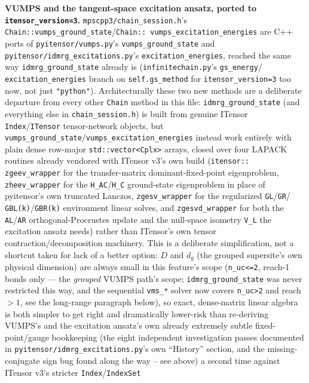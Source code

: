 \documentclass[11pt]{article}
\begin{document}
\textbf{VUMPS and the tangent-space excitation ansatz, ported to
\texttt{itensor\_version=3}.} \texttt{mpscpp3/chain\_session.h}'s
\texttt{Chain::vumps\_ground\_state}/\texttt{Chain::
vumps\_excitation\_energies} are C++ ports of
\texttt{pyitensor/vumps.py}'s \texttt{vumps\_ground\_state} and
\texttt{pyitensor/idmrg\_excitations.py}'s \texttt{excitation\_energies},
reached the same way \texttt{idmrg\_ground\_state} already is
(\texttt{infinitechain.py}'s \texttt{gs\_energy}/
\texttt{excitation\_energies} branch on \texttt{self.gs\_method} for
\texttt{itensor\_version=3} too now, not just \texttt{"python"}).
Architecturally these two new methods are a deliberate departure from
every other \texttt{Chain} method in this file: \texttt{idmrg\_ground\_state}
(and everything else in \texttt{chain\_session.h}) is built from genuine
ITensor \texttt{Index}/\texttt{ITensor} tensor-network objects, but
\texttt{vumps\_ground\_state}/\texttt{vumps\_excitation\_energies}
instead work entirely with plain dense row-major
\texttt{std::vector<Cplx>} arrays, closed over four LAPACK routines
already vendored with ITensor v3's own build (\texttt{itensor::
zgeev\_wrapper} for the transfer-matrix dominant-fixed-point
eigenproblem, \texttt{zheev\_wrapper} for the \texttt{H\_AC}/\texttt{H\_C}
ground-state eigenproblem in place of pyitensor's own truncated Lanczos,
\texttt{zgesv\_wrapper} for the regularized \texttt{GL}/\texttt{GR}/
\texttt{GBL(k)}/\texttt{GBR(k)} environment linear solves, and
\texttt{zgesvd\_wrapper} for both the \texttt{AL}/\texttt{AR}
orthogonal-Procrustes update and the null-space isometry \texttt{V\_L}
the excitation ansatz needs) rather than ITensor's own tensor
contraction/decomposition machinery. This is a deliberate
simplification, not a shortcut taken for lack of a better option: $D$
and $d_g$ (the grouped supersite's own physical dimension) are always
small in this feature's scope (\texttt{n\_uc<=2}, reach-1 bonds only ---
the \emph{grouped} VUMPS path's scope; \texttt{idmrg\_ground\_state} was
never restricted this way, and the sequential \texttt{vms\_*} solver now
covers \texttt{n\_uc>2} and reach${}>1$, see the long-range paragraph
below), so exact,
dense-matrix linear algebra is both simpler to get right and
dramatically lower-risk than re-deriving VUMPS's and the excitation
ansatz's own already extremely subtle fixed-point/gauge bookkeeping
(the eight independent investigation passes documented in
\texttt{pyitensor/idmrg\_excitations.py}'s own ``History'' section, and
the missing-conjugate sign bug found along the way -- see above) a
second time against ITensor v3's stricter \texttt{Index}/\texttt{IndexSet}
\end{document}
